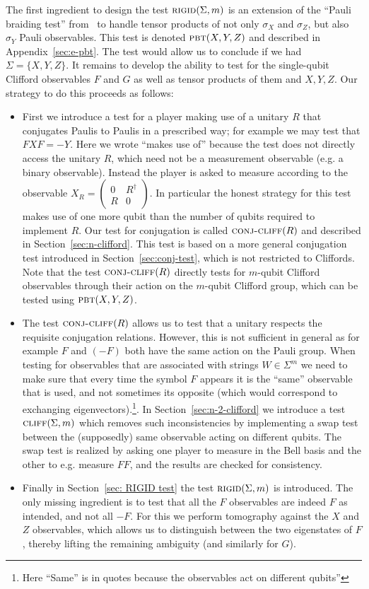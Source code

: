 \documentclass[11pt]{article}
\newcommand{\pbt}{\textsc{pbt}}
\newcommand{\rigid}{\textsc{rigid}}
\newcommand{\conjc}{\textsc{conj-cliff}}
\newcommand{\cliff}{\textsc{cliff}}
\begin{document}
The first ingredient to design the test $\rigid(\Sigma,m)$ is an extension of the ``Pauli braiding test'' from~\cite{natarajan2016robust} to handle tensor products of not only $\sigma_X$ and $\sigma_Z$, but also $\sigma_Y$ Pauli observables. This test is denoted $\pbt(X,Y,Z)$ and described in Appendix~\ref{sec:e-pbt}. The test would allow us to conclude if we had $\Sigma=\{X,Y,Z\}$. It remains to develop the ability to test for the single-qubit Clifford observables $F$ and $G$ as well as tensor products of them and $X,Y,Z$. Our strategy to do this proceeds as follows:
\begin{itemize}
\item First we introduce a test for a player making use of a unitary $R$ that conjugates Paulis to Paulis in a prescribed way; for example we may test that $FXF=-Y$. Here we wrote ``makes use of'' because the test does not directly access the unitary $R$, which need not be a measurement observable (e.g. a binary observable). Instead the player is asked to measure according to the observable $X_R = \begin{pmatrix} 0 & R^\dagger \\ R & 0 \end{pmatrix}$. In particular the honest strategy for this test makes use of one more qubit than the number of qubits required to implement $R$. Our test for conjugation is called $\conjc(R)$ and described in Section~\ref{sec:n-clifford}. This test is based on a more general conjugation test introduced in Section~\ref{sec:conj-test}, which is not restricted to Cliffords. Note that the test $\conjc(R)$ directly tests for $m$-qubit Clifford observables through their action on the $m$-qubit Clifford group, which can be tested using $\pbt(X,Y,Z)$. 
\item The test $\conjc(R)$ allows us to test that a unitary respects the requisite conjugation relations. However, this is not sufficient in general as for example $F$ and $(-F)$ both have the same action on the Pauli group. When testing for observables that are associated with strings $W\in\Sigma^m$ we need to make sure that every time the symbol $F$ appears it is the ``same'' observable that is used, and not sometimes its opposite (which would correspond to exchanging eigenvectors).\footnote{Here ``Same'' is in quotes because the observables act on different qubits''}. In Section~\ref{sec:n-2-clifford} we introduce a test $\cliff(\Sigma,m)$ which removes such inconsistencies by implementing a swap test between the (supposedly) same observable acting on different qubits. The swap test is realized by asking one player to measure in the Bell basis and the other to e.g. measure $FF$, and the results are checked for consistency. 
\item Finally in Section~\ref{sec: RIGID test} the test $\rigid(\Sigma,m)$ is introduced. The only missing ingredient is to test that all the $F$ observables are indeed $F$ as intended, and not all $-F$. For this we perform tomography against the $X$ and $Z$ observables, which allows us to distinguish between the two eigenstates of $F$, thereby lifting the remaining ambiguity (and similarly for $G$).
\end{itemize}
\end{document}
